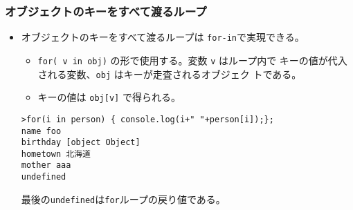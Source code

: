\begin{frame}[containsverbatim]
\frametitle{オブジェクトのキーをすべて渡るループ}
\begin{itemize}
 \item オブジェクトのキーをすべて渡るループは \Verb+for-in+で実現できる。
\begin{itemize}
 \item \Verb+for( v in obj)+ の形で使用する。変数 \Verb+v+ はループ内で
       キーの値が代入される変数、\Verb+obj+ はキーが走査されるオブジェク
       トである。
 \item キーの値は \Verb+obj[v]+ で得られる。
\end{itemize}
\begin{Verbatim}
>for(i in person) { console.log(i+" "+person[i]);};
name foo
birthday [object Object]
hometown 北海道
mother aaa
undefined
\end{Verbatim}
最後の\Verb+undefined+は\Verb+for+ループの戻り値である。
\end{itemize}
\end{frame}
